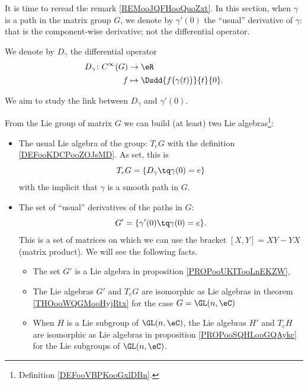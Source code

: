 \begin{normaltext}      \label{NORMooHZGKooJEiamo}
	It is time to reread the remark \ref{REMooJQFHooQuoZxt}. In this section, when \( \gamma\) is a path in the matrix group \( G\), we denote by \( \gamma'(0)\) the ``usual'' derivative of \( \gamma\): that is the component-wise derivative; not the differential operator.

	We denote by \( D_{\gamma}\) the differential operator
	\begin{equation}
		\begin{aligned}
			D_{\gamma}\colon  C^{\infty}(G) & \to \eR                                        \\
			f                               & \mapsto \Dsdd{ f\big( \gamma(t) \big) }{t}{0}.
		\end{aligned}
	\end{equation}

	We aim to study the link between \( D_{\gamma}\) and \( \gamma'(0)\).

	From the Lie group of matrix \( G\) we can build (at least) two Lie algebras\footnote{Definition \ref{DEFooVBPKooGxlDBn}.}:
	\begin{itemize}
		\item The usual Lie algebra of the group: \( T_eG\) with the definition \ref{DEFooKDCPooZOJsMD}. As set, this is
		      \begin{equation}
			      T_eG=\{ D_{\gamma}\tq \gamma(0)=e \}
		      \end{equation}
		      with the implicit that \( \gamma\) is a smooth path in \( G\).
		\item
		      The set of ``usual'' derivatives of the paths in \( G\):
		      \begin{equation}
			      G'=\{ \gamma'(0)\tq \gamma(0)=e \}.
		      \end{equation}
		      This is a set of matrices on which we can use the bracket \( [X,Y]=XY-YX\) (matrix product). We will see the following facts.
		      \begin{itemize}
			      \item
			            The set \( G'\) is a Lie algebra in proposition \ref{PROPooUKITooLnEKZW},
			      \item
			            The Lie algebras \( G'\) and \( T_eG\) are isomorphic as Lie algebras in theorem \ref{THOooWQGMooHyjRtx} for the case \( G=\GL(n,\eC)\)
			      \item
			            When \( H\) is a Lie subgroup of \( \GL(n,\eC)\), the Lie algebras \( H'\) and \( T_eH\) are isomorphic as Lie algebras in proposition \ref{PROPooSQHLooGQAykc} for the Lie subgroups of \( \GL(n,\eC)\).
		      \end{itemize}
	\end{itemize}
\end{normaltext}


